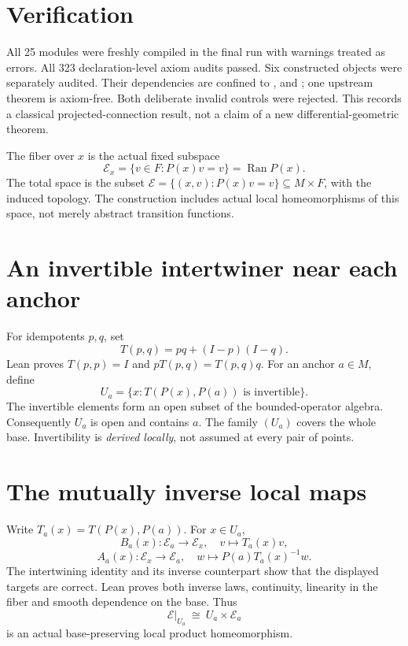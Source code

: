 \documentclass[10pt,letterpaper]{article}
\newcommand{\Ran}{\operatorname{Ran}}\newcommand{\Tr}{\operatorname{Tr}}
\newcommand{\pageheading}[2]{\vspace*{2pt}{\small\color{ink}\textsc{#1}}\par\vspace{2pt}{\Large\bfseries #2}\par\vspace{4pt}}
\begin{document}
\section*{Verification}
All 25 modules were freshly compiled in the final run with warnings treated as errors. All 323 declaration-level axiom audits passed. Six constructed objects were separately audited. Their dependencies are confined to ,  and ; one upstream theorem is axiom-free. Both deliberate invalid controls were rejected. This records a classical projected-connection result, not a claim of a new differential-geometric theorem.

\newpage
\pageheading{Actual range bundle}{Local products constructed from the projector}
The fiber over $x$ is the actual fixed subspace
\[
\mathcal E_x=\{v\in F:P(x)v=v\}=\Ran P(x).
\]
The total space is the subset $\mathcal E=\{(x,v):P(x)v=v\}\subseteq M\times F$, with the induced topology. The construction includes actual local homeomorphisms of this space, not merely abstract transition functions.

\section*{An invertible intertwiner near each anchor}
For idempotents $p,q$, set
\[
T(p,q)=pq+(I-p)(I-q).
\]
Lean proves $T(p,p)=I$ and $pT(p,q)=T(p,q)q$. For an anchor $a\in M$, define
\[
U_a=\{x:T(P(x),P(a))\text{ is invertible}\}.
\]
The invertible elements form an open subset of the bounded-operator algebra. Consequently $U_a$ is open and contains $a$. The family $(U_a)$ covers the whole base. Invertibility is \emph{derived locally}, not assumed at every pair of points.

\section*{The mutually inverse local maps}
Write $T_a(x)=T(P(x),P(a))$. For $x\in U_a$,
\[
B_a(x):\mathcal E_a\longrightarrow\mathcal E_x,
\quad v\longmapsto T_a(x)v,
\]
\[
A_a(x):\mathcal E_x\longrightarrow\mathcal E_a,
\quad w\longmapsto P(a)T_a(x)^{-1}w.
\]
The intertwining identity and its inverse counterpart show that the displayed targets are correct. Lean proves both inverse laws, continuity, linearity in the fiber and smooth dependence on the base. Thus
\[
\mathcal E|_{U_a}\ \cong\ U_a\times\mathcal E_a
\]
is an actual base-preserving local product homeomorphism.
\end{document}
